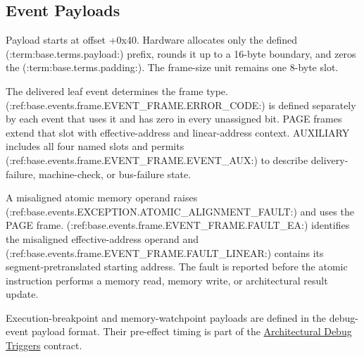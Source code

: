 \subsection{Event Payloads}
Payload starts at offset +0x40. Hardware allocates only the defined (:term:base.terms.payload:) prefix, rounds it up to a 16-byte
boundary, and zeros the (:term:base.terms.padding:). The frame-size unit remains one 8-byte slot.



The delivered leaf event determines the frame type. (:ref:base.events.frame.EVENT_FRAME.ERROR_CODE:) is defined
separately by each event that uses it and has zero in every unassigned bit. PAGE frames extend that slot with
effective-address and linear-address context. AUXILIARY includes all four named slots and permits (:ref:base.events.frame.EVENT_FRAME.EVENT_AUX:) to
describe delivery-failure, machine-check, or bus-failure state.

A misaligned atomic memory operand raises (:ref:base.events.EXCEPTION.ATOMIC_ALIGNMENT_FAULT:) and uses the PAGE frame.
(:ref:base.events.frame.EVENT_FRAME.FAULT_EA:) identifies the misaligned effective-address operand and (:ref:base.events.frame.EVENT_FRAME.FAULT_LINEAR:) contains
its segment-pretranslated starting address. The fault is reported before the atomic instruction performs a memory
read, memory write, or architectural result update.

Execution-breakpoint and memory-watchpoint payloads are defined in the debug-event payload format. Their pre-effect
timing is part of the \hyperref[page:architectural-debug]{Architectural Debug Triggers} contract.

